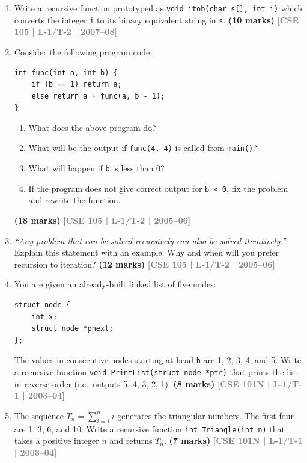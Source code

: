 \documentclass[12pt,a3paper]{article}
\newcommand{\yr}[1]{\hfill\textcolor{gray}{\small\textbf{[#1]}}}
\newcommand{\mk}[1]{\textcolor{orange!70!black}{\small\textbf{(#1 marks)}}}
\begin{document}
\begin{enumerate}
\item Write a recursive function prototyped as \texttt{void itob(char s[], int i)} which converts the integer \texttt{i} to its binary equivalent string in \texttt{s}.
\mk{10} \yr{CSE 105 | L-1/T-2 | 2007--08}


\item Consider the following program code:
 
\begin{lstlisting}
int func(int a, int b) {
    if (b == 1) return a;
    else return a + func(a, b - 1);
}
\end{lstlisting}
\begin{enumerate}
  \item What does the above program do?
  \item What will be the output if \texttt{func(4, 4)} is called from \texttt{main()}?
  \item What will happen if \texttt{b} is less than 0?
  \item If the program does not give correct output for \texttt{b < 0}, fix the problem and rewrite the function.
\end{enumerate}
\mk{18} \yr{CSE 105 | L-1/T-2 | 2005--06}

\item \textit{``Any problem that can be solved recursively can also be solved iteratively.''} Explain this statement with an example. Why and when will you prefer recursion to iteration?
\mk{12} \yr{CSE 105 | L-1/T-2 | 2005--06}

\item You are given an already-built linked list of five nodes:
\begin{lstlisting}
struct node {
    int x;
    struct node *pnext;
};
\end{lstlisting}
The values in consecutive nodes starting at head \texttt{h} are 1, 2, 3, 4, and 5. Write a recursive function \texttt{void PrintList(struct node *ptr)} that prints the list in reverse order (i.e.\ outputs 5, 4, 3, 2, 1).
\mk{8} \yr{CSE 101N | L-1/T-1 | 2003--04}

\item The sequence $T_n = \sum_{i=1}^{n} i$ generates the triangular numbers. The first four are 1, 3, 6, and 10. Write a recursive function \texttt{int Triangle(int n)} that takes a positive integer $n$ and returns $T_n$.
\mk{7} \yr{CSE 101N | L-1/T-1 | 2003--04}

\end{enumerate}
\end{document}
